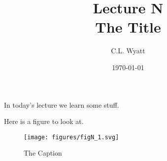 \documentclass{article}
\begin{document}
\title{Lecture N\\ The Title}
\author{C.L. Wyatt}
\date{\today}
\maketitle

In today's lecture we learn some stuff.

Here is a figure to look at.

\begin{figure}
  \centering
  \texttt{[image: figures/figN\_1.svg]}
  \caption{The Caption}
\end{figure}
\end{document}
